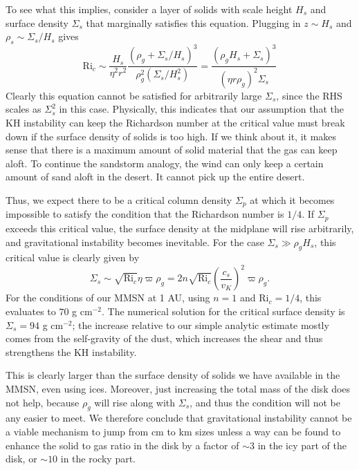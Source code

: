 To see what this implies, consider a layer of solids with scale height $H_s$ and surface density $\Sigma_s$ that marginally satisfies this equation. Plugging in $z\sim H_s$ and $\rho_s \sim \Sigma_s/H_s$ gives
\begin{equation}
\mbox{Ri}_c \sim \frac{H_s}{\eta^2 r^2} \frac{(\rho_g + \Sigma_s/H_s)^3}{\rho_g^2 (\Sigma_s/H_s^2)} = \frac{(\rho_g H_s + \Sigma_s)^3}{(\eta r \rho_g)^2 \Sigma_s}
\end{equation}
Clearly this equation cannot be satisfied for arbitrarily large $\Sigma_s$, since the RHS scales as $\Sigma_s^2$ in this case. Physically, this indicates that our assumption that the KH instability can keep the Richardson number at the critical value must break down if the surface density of solids is too high. If we think about it, it makes sense that there is a maximum amount of solid material that the gas can keep aloft. To continue the sandstorm analogy, the wind can only keep a certain amount of sand aloft in the desert. It cannot pick up the entire desert.

Thus, we expect there to be a critical column density $\Sigma_p$ at which it becomes impossible to satisfy the condition that the Richardson number is $1/4$. If $\Sigma_p$ exceeds this critical value, the surface density at the midplane will rise arbitrarily, and gravitational instability becomes inevitable. For the case $\Sigma_s \gg \rho_g H_s$, this critical value is clearly given by
\begin{equation}
\Sigma_s \sim \sqrt{\mbox{Ri}_c} \eta \varpi \rho_g = 2 n \sqrt{\mbox{Ri}_c} \left(\frac{c_s}{v_K}\right)^2 \varpi \rho_g.
\end{equation}
For the conditions of our MMSN at 1 AU, using $n=1$ and $\mbox{Ri}_c=1/4$, this evaluates to $70$ g cm$^{-2}$. The numerical solution for the critical surface density is $\Sigma_s=94$ g cm$^{-2}$; the increase relative to our simple analytic estimate mostly comes from the self-gravity of the dust, which increases the shear and thus strengthens the KH instability.

This is clearly larger than the surface density of solids we have available in the MMSN, even using ices. Moreover, just increasing the total mass of the disk does not help, because $\rho_g$ will rise along with $\Sigma_s$, and thus the condition will not be any easier to meet. We therefore conclude that gravitational instability cannot be a viable mechanism to jump from cm to km sizes unless a way can be found to enhance the solid to gas ratio in the disk by a factor of $\sim 3$ in the icy part of the disk, or $\sim 10$ in the rocky part. 

